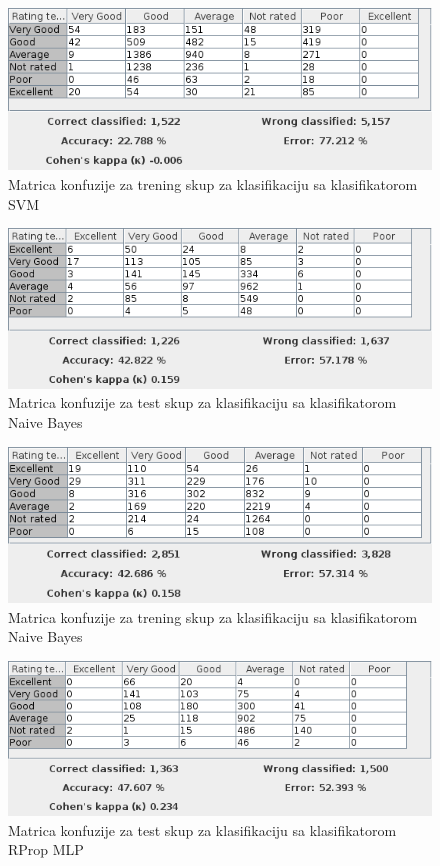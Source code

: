 \documentclass[11pt]{article} %
\begin{document}
\begin{figure}[h!]
	\centering
	\includegraphics[width=1.1\textwidth]{ratingClassificationTraining/SVM}
	\caption{Matrica konfuzije za trening skup za klasifikaciju sa klasifikatorom SVM}
\end{figure}
\newline
\begin{figure}[h!]
	\centering
	\includegraphics[width=1.1\textwidth]{ratingClassificationTest/NaiveBayes}
	\caption{Matrica konfuzije za test skup za klasifikaciju sa klasifikatorom Naive Bayes}
\end{figure}
\begin{figure}[h!]
	\centering
	\includegraphics[width=1.1\textwidth]{ratingClassificationTraining/NaiveBayes}
	\caption{Matrica konfuzije za trening skup za klasifikaciju sa klasifikatorom Naive Bayes}
\end{figure}
\newline
\begin{figure}[h!]
	\centering
	\includegraphics[width=1.1\textwidth]{ratingClassificationTest/RProp}
	\caption{Matrica konfuzije za test skup za klasifikaciju sa klasifikatorom RProp MLP}
\end{figure}
\end{document}
